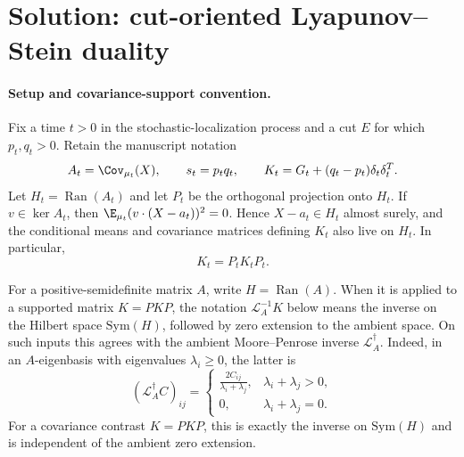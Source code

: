\documentclass[../main.tex]{subfiles}
\begin{document}
%
\section*{Solution: cut-oriented Lyapunov--Stein duality}
\label{sec:sol-lyapunov-stein-duality}

\paragraph{Setup and covariance-support convention.}
Fix a time $t>0$ in the stochastic-localization process and a cut $E$ for which
$p_t,q_t>0$.  Retain the manuscript notation
\[
 A_t=\Cov_{\mu_t}(X),\qquad s_t=p_tq_t,
 \qquad K_t=G_t+(q_t-p_t)\delta_t\delta_t^T.
\]
Let $H_t=\operatorname{Ran}(A_t)$ and let $P_t$ be the orthogonal projection onto $H_t$.
If $v\in\ker A_t$, then
$\E_{\mu_t}(v\cdot(X-a_t))^2=0$.  Hence $X-a_t\in H_t$ almost surely, and the conditional
means and covariance matrices defining $K_t$ also live on $H_t$.  In particular,
\begin{equation}\label{eq:sol-K-on-support}
 K_t=P_tK_tP_t.
\end{equation}

For a positive-semidefinite matrix $A$, write $H=\operatorname{Ran}(A)$.  When it is applied to
a supported matrix $K=PKP$, the notation $\mathscr L_A^{-1}K$ below means the inverse on the
Hilbert space $\mathrm{Sym}(H)$, followed by zero extension to the ambient space.  On such
inputs this agrees with the ambient Moore--Penrose inverse $\mathscr L_A^\dagger$.  Indeed, in
an $A$-eigenbasis with eigenvalues $\lambda_i\ge0$, the latter is
\begin{equation}\label{eq:sol-lyapunov-pseudoinverse}
 (\mathscr L_A^\dagger C)_{ij}
 =
 \begin{cases}
 \displaystyle\frac{2C_{ij}}{\lambda_i+\lambda_j},&\lambda_i+\lambda_j>0,\\[6pt]
 0,&\lambda_i+\lambda_j=0.
 \end{cases}
\end{equation}
For a covariance contrast $K=PKP$, this is exactly the inverse on
$\mathrm{Sym}(H)$ and is independent of the ambient zero extension.
\end{document}
